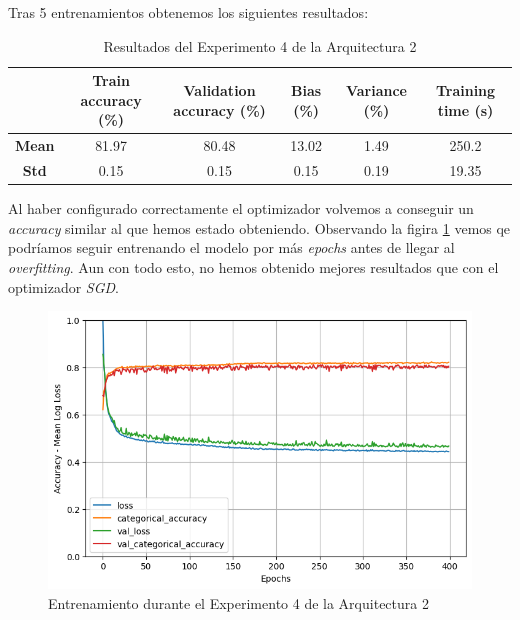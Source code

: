 \documentclass{article}
\begin{document}
			Tras 5 entrenamientos obtenemos los siguientes resultados:
			
			\begin{table}[!h]
				\begin{center}
					\begin{tabular}{ c | c | c | c | c | c |}
						\ & \textbf{Train accuracy (\%)} & \textbf{Validation accuracy (\%)} & \textbf{Bias (\%)} & \textbf{Variance (\%)} & \textbf{Training time (s)} \\ \hline
						\textbf{Mean} & 81.97 & 80.48 & 13.02 & 1.49 & 250.2 \\ \hline
						\textbf{Std} & 0.15 & 0.15 & 0.15 & 0.19 & 19.35 \\ \hline
					\end{tabular}
					\caption{Resultados del Experimento 4 de la Arquitectura 2}
					\label{tab:res-a2-e4}
				\end{center}
			\end{table}
			
			Al haber configurado correctamente el optimizador volvemos a conseguir un \textit{accuracy} similar al que hemos estado obteniendo. Observando la figira \ref{tr-a2-e4} vemos qe podr\'iamos seguir entrenando el modelo por m\'as \textit{epochs} antes de llegar al \textit{overfitting}. Aun con todo esto, no hemos obtenido mejores resultados que con el optimizador \textit{SGD}.
			\begin{figure}[!h]
				\begin{center}
					\includegraphics[scale=0.5]{tr-a2-e4.png}		
					\caption{Entrenamiento durante el Experimento 4 de la Arquitectura 2}	
					\label{tr-a2-e4}
				\end{center}
			\end{figure}
			
\end{document}
